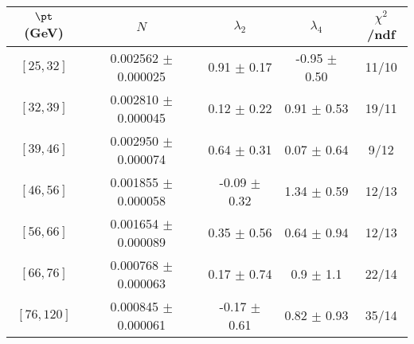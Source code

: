\begin{tabular}{c||c|c|c|c}
$\pt$ (GeV) & $N$ & $\lambda_{2}$ & $\lambda_4$  & $\chi^2$/ndf  \\
\hline
$[25, 32]$ & 0.002562 $\pm$ 0.000025 & 0.91 $\pm$ 0.17 & -0.95 $\pm$ 0.50 & 11/10\\
$[32, 39]$ & 0.002810 $\pm$ 0.000045 & 0.12 $\pm$ 0.22 & 0.91 $\pm$ 0.53 & 19/11\\
$[39, 46]$ & 0.002950 $\pm$ 0.000074 & 0.64 $\pm$ 0.31 & 0.07 $\pm$ 0.64 & 9/12\\
$[46, 56]$ & 0.001855 $\pm$ 0.000058 & -0.09 $\pm$ 0.32 & 1.34 $\pm$ 0.59 & 12/13\\
$[56, 66]$ & 0.001654 $\pm$ 0.000089 & 0.35 $\pm$ 0.56 & 0.64 $\pm$ 0.94 & 12/13\\
$[66, 76]$ & 0.000768 $\pm$ 0.000063 & 0.17 $\pm$ 0.74 & 0.9 $\pm$ 1.1 & 22/14\\
$[76, 120]$ & 0.000845 $\pm$ 0.000061 & -0.17 $\pm$ 0.61 & 0.82 $\pm$ 0.93 & 35/14\\
\end{tabular}
